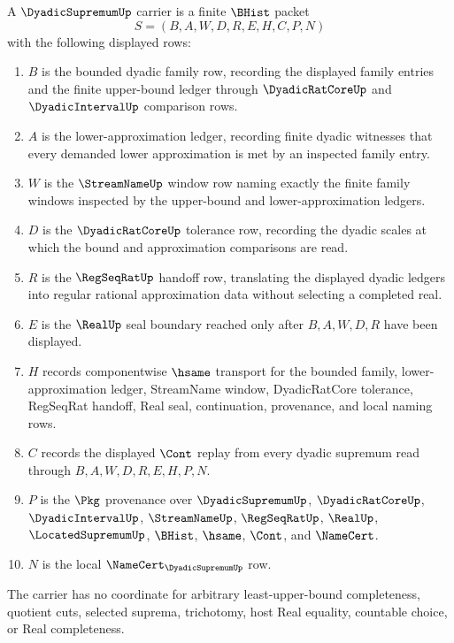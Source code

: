 \begin{definition}
\label{def:dyadic-supremum-carrier}
A $\DyadicSupremumUp$ carrier is a finite $\BHist$ packet
$$
S=(B,A,W,D,R,E,H,C,P,N)
$$
with the following displayed rows:
\begin{enumerate}
\item $B$ is the bounded dyadic family row, recording the displayed family entries and the finite upper-bound ledger through $\DyadicRatCoreUp$ and $\DyadicIntervalUp$ comparison rows.
\item $A$ is the lower-approximation ledger, recording finite dyadic witnesses that every demanded lower approximation is met by an inspected family entry.
\item $W$ is the $\StreamNameUp$ window row naming exactly the finite family windows inspected by the upper-bound and lower-approximation ledgers.
\item $D$ is the $\DyadicRatCoreUp$ tolerance row, recording the dyadic scales at which the bound and approximation comparisons are read.
\item $R$ is the $\RegSeqRatUp$ handoff row, translating the displayed dyadic ledgers into regular rational approximation data without selecting a completed real.
\item $E$ is the $\RealUp$ seal boundary reached only after $B,A,W,D,R$ have been displayed.
\item $H$ records componentwise $\hsame$ transport for the bounded family, lower-approximation ledger, StreamName window, DyadicRatCore tolerance, RegSeqRat handoff, Real seal, continuation, provenance, and local naming rows.
\item $C$ records the displayed $\Cont$ replay from every dyadic supremum read through $B,A,W,D,R,E,H,P,N$.
\item $P$ is the $\Pkg$ provenance over $\DyadicSupremumUp$, $\DyadicRatCoreUp$, $\DyadicIntervalUp$, $\StreamNameUp$, $\RegSeqRatUp$, $\RealUp$, $\LocatedSupremumUp$, $\BHist$, $\hsame$, $\Cont$, and $\NameCert$.
\item $N$ is the local $\NameCert_{\DyadicSupremumUp}$ row.
\end{enumerate}
The carrier has no coordinate for arbitrary least-upper-bound completeness, quotient cuts, selected suprema, trichotomy, host Real equality, countable choice, or Real completeness.
\end{definition}

